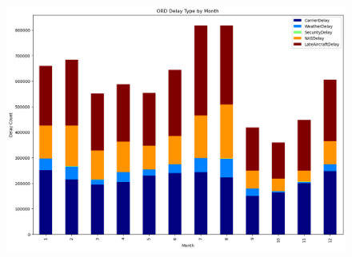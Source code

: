 \documentclass[a4paper,11pt]{article}
\begin{document}
\begin{figure}
    \centering
    \includegraphics*[scale=.40]{../../img/ord_delay_t_month.png}
    \caption[]{}
    \label{fig:delaybymonth}
\end{figure}
\end{document}
